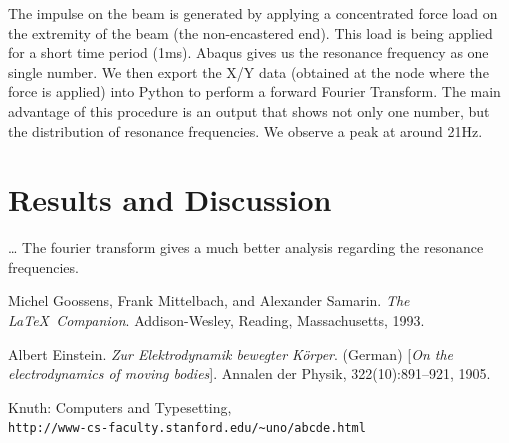 \documentclass[12pt]{article}
\begin{document}
\noindent The impulse on the beam is generated by applying a concentrated force load on the extremity of the beam (the non-encastered end).
This load is being applied for a short time period (1ms). Abaqus gives us the resonance frequency as one single number. 
We then export the X/Y data (obtained at the node where the force is applied) 
into Python to perform a forward Fourier Transform.
The main advantage of this procedure is an output that shows not only one number, 
but the distribution of resonance frequencies. We observe a peak at around 21Hz.


\section{Results and Discussion}

\dots
The fourier transform gives a much better analysis regarding the resonance frequencies.


\pagebreak
\begin{thebibliography}{9}
  Michel Goossens, Frank Mittelbach, and Alexander Samarin. 
  \textit{The \LaTeX\ Companion}. 
  Addison-Wesley, Reading, Massachusetts, 1993.
   
  Albert Einstein. 
  \textit{Zur Elektrodynamik bewegter K{\"o}rper}. (German) 
  [\textit{On the electrodynamics of moving bodies}]. 
  Annalen der Physik, 322(10):891–921, 1905.
   
  Knuth: Computers and Typesetting,
  \\\texttt{http://www-cs-faculty.stanford.edu/\~{}uno/abcde.html}
\end{thebibliography}
\end{document}
